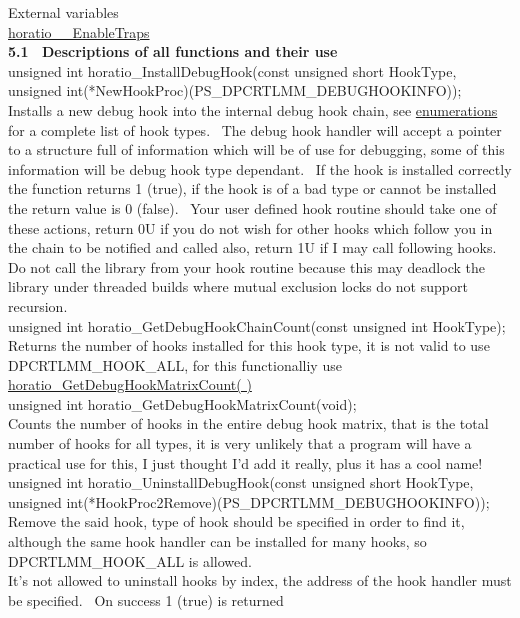 \documentclass{article}
\begin{document}
\par External variables
\\
\href{#\_EnableTraps}{horatio\_\_EnableTraps}
\\
\textbf{5.1~ Descriptions of all functions and their use}
\\
unsigned int horatio\_InstallDebugHook(const
unsigned short HookType, unsigned
int(*NewHookProc)(PS\_DPCRTLMM\_DEBUGHOOKINFO));
\\
Installs a new debug hook into the internal debug
hook chain, see \href{#Enumerations}{enumerations} for a
complete list of hook types.~ The
debug hook handler will accept a pointer to a structure full of
information
which will be of use for debugging, some of this information will be
debug
hook type dependant.~ If the hook is installed correctly the
function
returns 1 (true), if the hook is of a bad type or cannot be installed
the
return value is 0 (false).~ Your user defined hook routine should
take one of these actions, return 0U if you do not wish for other hooks
which follow you in the chain to be notified and called also, return 1U
if I may call following hooks.
\\
Do not call the library from your hook routine because this may
deadlock the library under threaded builds where mutual exclusion locks
do not support recursion.
\\
unsigned int
horatio\_GetDebugHookChainCount(const
unsigned int HookType);
\\
Returns the number of hooks installed for this
hook type, it is not valid to use DPCRTLMM\_HOOK\_ALL, for this
functionalliy
use \href{#GetDebugHookMatrixCount}{horatio\_GetDebugHookMatrixCount(
)}
\\
unsigned int
horatio\_GetDebugHookMatrixCount(void);
\\
Counts the number of hooks in the entire debug hook matrix, that is
the total number of hooks for all types, it is very unlikely that a
program
will have a practical use for this, I just thought I'd add it really,
plus
it has a cool name!
\\
unsigned int horatio\_UninstallDebugHook(const
unsigned short HookType, unsigned
int(*HookProc2Remove)(PS\_DPCRTLMM\_DEBUGHOOKINFO));
\\
Remove the said hook, type of hook should be specified in order to
find it, although the same hook handler can be installed for many
hooks,
so DPCRTLMM\_HOOK\_ALL is allowed.
\\
It's not allowed to uninstall hooks by index, the address of the hook
handler must be specified.~ On success 1 (true) is returned
\end{document}
